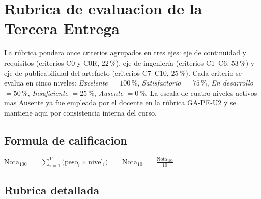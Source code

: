 \documentclass[11pt,a4paper]{article}
\begin{document}
\section{Rubrica de evaluacion de la Tercera Entrega}

La r\'{u}brica pondera once criterios agrupados en tres ejes: eje de continuidad y requisitos (criterios C0 y C0R, $22$\,\%), eje de ingenier\'{i}a (criterios C1--C6, $53$\,\%) y eje de publicabilidad del artefacto (criterios C7--C10, $25$\,\%). Cada criterio se evalua en cinco niveles: \emph{Excelente} $= 100$\,\%, \emph{Satisfactorio} $= 75$\,\%, \emph{En desarrollo} $= 50$\,\%, \emph{Insuficiente} $= 25$\,\%, \emph{Ausente} $= 0$\,\%. La escala de cuatro niveles activos mas Ausente ya fue empleada por el docente en la r\'{u}brica GA-PE-U2 y se mantiene aqui por consistencia interna del curso.

\subsection{Formula de calificacion}

\begin{center}
$\displaystyle \text{Nota}_{100} \;=\; \sum_{i=1}^{11} \bigl(\text{peso}_{i} \times \text{nivel}_{i}\bigr) \qquad \text{Nota}_{10} \;=\; \frac{\text{Nota}_{100}}{10}$
\end{center}

\subsection{Rubrica detallada}
\end{document}
